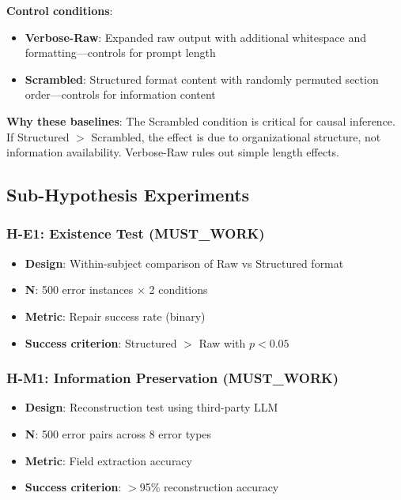 \textbf{Control conditions}:
\begin{itemize}
    \item \textbf{Verbose-Raw}: Expanded raw output with additional whitespace and formatting---controls for prompt length
    \item \textbf{Scrambled}: Structured format content with randomly permuted section order---controls for information content
\end{itemize}

\textbf{Why these baselines}: The Scrambled condition is critical for causal inference. If Structured $>$ Scrambled, the effect is due to organizational structure, not information availability. Verbose-Raw rules out simple length effects.

\subsection{Sub-Hypothesis Experiments}

\subsubsection{H-E1: Existence Test (MUST\_WORK)}
\begin{itemize}
    \item \textbf{Design}: Within-subject comparison of Raw vs Structured format
    \item \textbf{N}: 500 error instances $\times$ 2 conditions
    \item \textbf{Metric}: Repair success rate (binary)
    \item \textbf{Success criterion}: Structured $>$ Raw with $p < 0.05$
\end{itemize}

\subsubsection{H-M1: Information Preservation (MUST\_WORK)}
\begin{itemize}
    \item \textbf{Design}: Reconstruction test using third-party LLM
    \item \textbf{N}: 500 error pairs across 8 error types
    \item \textbf{Metric}: Field extraction accuracy
    \item \textbf{Success criterion}: $>$95\% reconstruction accuracy
\end{itemize}

